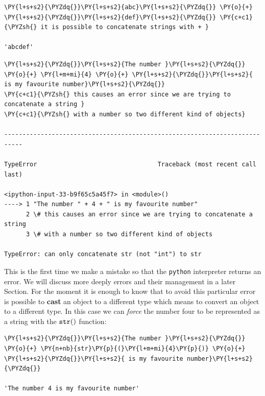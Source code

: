 \begin{codebox}[breakable, size=fbox, boxrule=1pt, pad at break*=1mm, colback=cellbackground, colframe=cellborder]            
\begin{Verbatim}[commandchars=\\\{\}]
\PY{l+s+s2}{\PYZdq{}}\PY{l+s+s2}{abc}\PY{l+s+s2}{\PYZdq{}} \PY{o}{+} \PY{l+s+s2}{\PYZdq{}}\PY{l+s+s2}{def}\PY{l+s+s2}{\PYZdq{}} \PY{c+c1}{\PYZsh{} it is possible to concatenate strings with + }

'abcdef'
\end{Verbatim}
\end{codebox}

\begin{codebox}[breakable, size=fbox, boxrule=1pt, pad at break*=1mm, colback=cellbackground, colframe=cellborder]            
\begin{Verbatim}[commandchars=\\\{\}]
\PY{l+s+s2}{\PYZdq{}}\PY{l+s+s2}{The number }\PY{l+s+s2}{\PYZdq{}} \PY{o}{+} \PY{l+m+mi}{4} \PY{o}{+} \PY{l+s+s2}{\PYZdq{}}\PY{l+s+s2}{ is my favourite number}\PY{l+s+s2}{\PYZdq{}}
\PY{c+c1}{\PYZsh{} this causes an error since we are trying to concatenate a string }
\PY{c+c1}{\PYZsh{} with a number so two different kind of objects}

---------------------------------------------------------------------------

TypeError                                 Traceback (most recent call last)

<ipython-input-33-b9f65c5a45f7> in <module>()
----> 1 "The number " + 4 + " is my favourite number"
      2 \# this causes an error since we are trying to concatenate a string
      3 \# with a number so two different kind of objects

TypeError: can only concatenate str (not "int") to str
\end{Verbatim}
\end{codebox}

This is the first time we make a mistake so that the \texttt{python} interpreter returns an error. We will 
discuss more deeply errors and their management in a later Section. 
For the moment it is enough to know that to avoid this particular error is possible to \textbf{cast} an object to a 
different type which means to convert an object to a different type. In this case we can \emph{force} the number four to be represented as a string with the \(\tt{str()}\) function:

\begin{codebox}[breakable, size=fbox, boxrule=1pt, pad at break*=1mm, colback=cellbackground, colframe=cellborder]            
\begin{Verbatim}[commandchars=\\\{\}]
\PY{l+s+s2}{\PYZdq{}}\PY{l+s+s2}{The number }\PY{l+s+s2}{\PYZdq{}} \PY{o}{+} \PY{n+nb}{str}\PY{p}{(}\PY{l+m+mi}{4}\PY{p}{)} \PY{o}{+} \PY{l+s+s2}{\PYZdq{}}\PY{l+s+s2}{ is my favourite number}\PY{l+s+s2}{\PYZdq{}}

'The number 4 is my favourite number'
\end{Verbatim}
\end{codebox}

